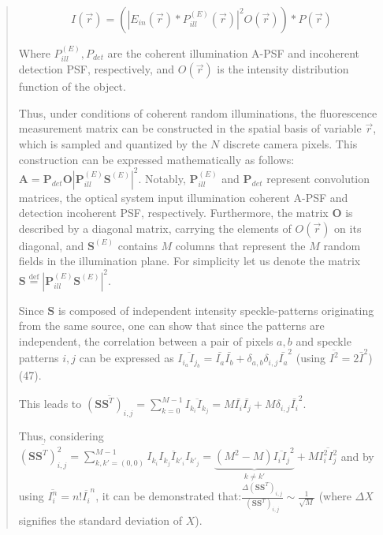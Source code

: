 \documentclass[12pt]{article}
\newenvironment{ourresponse}
    {\begin{tcolorbox}[width=\linewidth,breakable,enhanced,colback=gray!5,colframe=responsecolor!50,title=Response,left=5pt,right=5pt]}
    {\end{tcolorbox}}
\begin{document}
\begin{enumerate}[label=\arabic*.]
\begin{ourresponse}
\begin{quote}
            \begin{equation}
            {I}(\vec{r}) = (|{E}_{in}(\vec{r})*{P}^{(E)}_{ill}(\vec{r})|^2{O}(\vec{r}))*{P}(\vec{r})
            \label{eq:1}
            \tag{S1}
            \end{equation}
            
            Where ${P}^{(E)}_{ill}, {P}_{det}$ are the coherent illumination A-PSF and incoherent detection PSF, respectively, and ${O}(\vec{r})$ is the intensity distribution function of the object.
            
            Thus, under conditions of coherent random illuminations, the fluorescence measurement matrix can be constructed in the spatial basis of variable $\vec{r}$, which is sampled and quantized by the $N$ discrete camera pixels. This construction can be expressed mathematically as follows: ${\textbf{A}} = \textbf{P}_{det}\textbf{O}|\textbf{P}^{(E)}_{ill}\textbf{S}^{(E)}|^2$.
            Notably, $\textbf{P}^{(E)}_{ill}$ and $\textbf{P}_{det}$ represent convolution matrices, the optical system input illumination coherent A-PSF and detection incoherent PSF, respectively. Furthermore, the matrix ${\textbf{O}}$ is described by a diagonal matrix, carrying the elements of ${O}(\vec{r})$ on its diagonal, and $\textbf{S}^{(E)}$ contains $M$ columns that represent the $M$ random fields in the illumination plane. For simplicity let us denote the matrix  $\textbf{S} \stackrel{\text{def}} = |\textbf{P}^{(E)}_{ill}\textbf{S}^{(E)}|^2$.
            
            Since $\textbf{S}$ is composed of independent intensity speckle-patterns originating from the same source, one can show that since the patterns are independent, the correlation between a pair of pixels ${a,b}$ and speckle patterns ${i,j}$ can be expressed as $\overline{I_{i_a}I_{j_b}}=\bar{I_a}\bar{I_b}+\delta_{a,b}\delta_{i,j}\bar{I_a}^2$ (using $\overline{I^2}=2\bar{I}^2$) (47).
            
            \noindent This leads to $\overline{(\textbf{S}\textbf{S}^{T})_{i,j}} = \sum^{M-1}_{k=0}\overline{I_{k_i}I_{k_j}} = M\bar{I_i}\bar{I_j}+M\delta_{i,j}\bar{I_i}^2$.
            
            \noindent Thus, considering $\overline{(\textbf{S}\textbf{S}^{T})^2_{i,j}}=\sum^{M-1}_{k,k'=(0,0)}\overline{I_{k_i}I_{k_j}I_{k'_i}I_{k'_j}} = \underbrace{(M^2-M)\overline{I_{i}I_{j}}^2}_{k\neq k'}+M\overline{I^2_{i}I^2_{j}}$ 
            and by using $\overline{I^n_i}=n!\overline{I_i}^n$,  it can be demonstrated that:$\frac{\Delta(\textbf{S}\textbf{S}^{T})_{i,j}}{(\textbf{S}\textbf{S}^{T})_{i,j}} \sim \frac{1}{\sqrt{M}}$
            (where $\Delta X$ signifies the standard deviation of $X$). 
            

\end{quote}
\end{ourresponse}
\end{enumerate}
\end{document}
